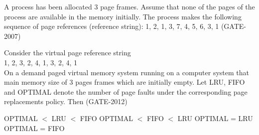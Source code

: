 
\begin{questyle}

  \question  A process has been allocated 3 page frames. Assume that none of the pages of the process are
            available in the memory initially. The process makes the following sequence of
            page references (reference string): 1, 2, 1, 3, 7, 4, 5, 6, 3, 1 (GATE-2007)


\end{questyle}


\begin{questyle}

  \question  Consider the virtual page reference string \\ 1, 2, 3, 2, 4, 1, 3, 2, 4, 1 \\
             On a demand paged virtual memory system running on a computer system that main memory size of 3 pages
             frames which are initially empty. Let LRU, FIFO and OPTIMAL denote the number of page faults under
             the corresponding page replacements policy. Then (GATE-2012)

  \begin{choices}
    \choice OPTIMAL \(<\) LRU \(<\) FIFO
    \choice OPTIMAL \(<\) FIFO \(<\) LRU
    \choice OPTIMAL = LRU
    \choice OPTIMAL = FIFO
  \end{choices}

\end{questyle}


